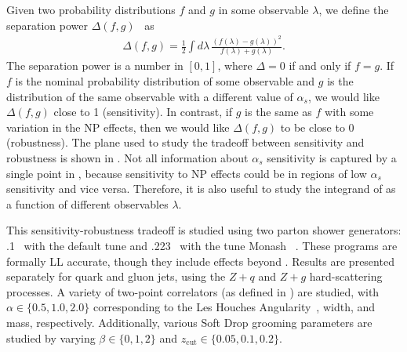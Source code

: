 Given two probability distributions $f$ and $g$ in some observable $\lambda$, we define the separation power $\Delta(f,g)$~\cite{Harrison:1998yr} as
%
\begin{align}
\label{eq:seppower}
\Delta(f,g)=\frac{1}{2}\int d\lambda \, \frac{(f(\lambda)-g(\lambda))^2}{f(\lambda)+g(\lambda)}.
\end{align}
%
The separation power is a number in $[0,1]$, where $\Delta=0$ if and only if $f=g$.
%
If $f$ is the nominal probability distribution of some observable and $g$ is the distribution of the same observable with a different value of $\alpha_s$, we would like $\Delta(f,g)$ close to 1 (sensitivity).
%
In contrast, if $g$ is the same as $f$ with some variation in the NP effects, then we would like $\Delta(f,g)$ to be close to $0$ (robustness).
%
The plane used to study the tradeoff between sensitivity and robustness is shown in .
%
Not all information about $\alpha_s$ sensitivity is captured by a single point in , because sensitivity to NP effects could be in regions of low $\alpha_s$ sensitivity and vice versa.
%
Therefore, it is also useful to study the integrand of  as a function of different observables $\lambda$.


This sensitivity-robustness tradeoff is studied using two parton shower generators: \herwig.1~\cite{Bellm:2015jjp,Reichelt:2017hts} with the default tune and \pythia.223~\cite{Sjostrand:2006za,Sjostrand:2014zea} with the tune Monash~\cite{Skands:2014pea} .
%
These programs are formally LL accurate, though they include effects beyond .
%
Results are presented separately for quark and gluon jets, using the $Z+q$ and $Z+g$ hard-scattering processes.
%
A variety of two-point correlators (as defined in ) are studied, with $\alpha\in\{0.5,1.0, 2.0\}$ corresponding to the Les Houches Angularity~\cite{Gras:2017jty}, width, and mass, respectively. 
%
Additionally, various Soft Drop grooming parameters are studied by varying $\beta\in\{0,1,2\}$ and $z_\text{cut}\in \{0.05,0.1,0.2\}$.  

